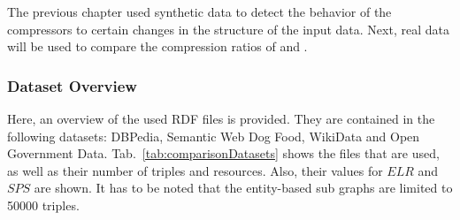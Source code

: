 The previous chapter used synthetic data to detect the behavior of the compressors to certain changes in the structure of the input data. Next, real data will be used to compare the compression ratios of \GHDT{} and \GGRP{}. 

\subsubsection{Dataset Overview}

Here, an overview of the used RDF files is provided. They are contained in the following datasets: DBPedia, Semantic Web Dog Food, WikiData and Open Government Data. Tab.~\ref{tab:comparisonDatasets} shows the files that are used, as well as their number of triples and resources. Also, their values for $ELR$ and $SPS$ are shown. It has to be noted that the entity-based sub graphs are limited to 50000 triples.

